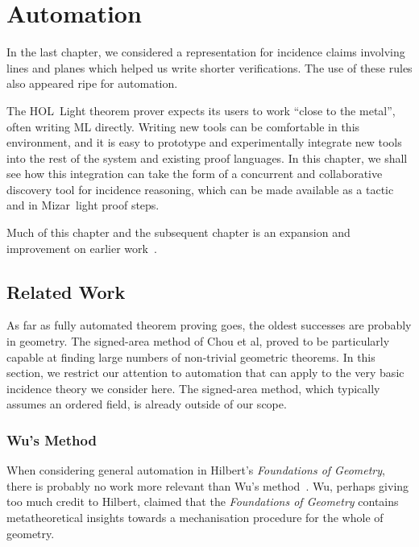 \chapter{Automation}\label{chapter:Automation}
In the last chapter, we considered a representation for incidence claims involving lines and planes which helped us write shorter verifications. The use of these rules also appeared ripe for automation. 

The HOL~Light theorem prover expects its users to work ``close to the metal'', often writing ML directly. Writing new tools can be comfortable in this environment, and it is easy to prototype and experimentally integrate new tools into the rest of the system and existing proof languages. In this chapter, we shall see how this integration can take the form of a concurrent and collaborative discovery tool for incidence reasoning, which can be made available as a tactic and in Mizar~light proof steps.

Much of this chapter and the subsequent chapter is an expansion and improvement on earlier work~\cite{ScottExploring,ScottComposable}.

\section{Related Work}
As far as fully automated theorem proving goes, the oldest successes are probably in geometry. The signed-area method \cite{MachineProofsInGeometry} of Chou et al, proved to be particularly capable at finding large numbers of non-trivial geometric theorems. In this section, we restrict our attention to automation that can apply to the very basic incidence theory we consider here. The signed-area method, which typically assumes an ordered field, is already outside of our scope.

\subsection{Wu's Method}
When considering general automation in Hilbert's \emph{Foundations of Geometry}, there is probably no work more relevant than Wu's method~\cite{WuMechanicalTheoremProving}. Wu, perhaps giving too much credit to Hilbert, claimed that the \emph{Foundations of Geometry} contains metatheoretical insights towards a mechanisation procedure for the whole of geometry. 

